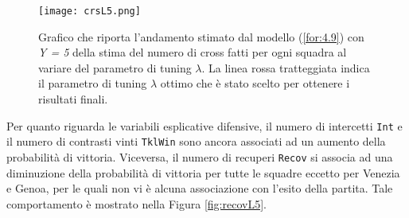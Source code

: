 \begin{figure}[htbp]
	\begin{center}
		\texttt{[image: crsL5.png]}
		\caption{Grafico che riporta l'andamento stimato dal modello (\ref{for:4.9}) con \emph{Y = 5} della stima del numero di cross fatti per ogni squadra al variare del parametro di tuning $\lambda$. La linea rossa tratteggiata indica il parametro di tuning $\lambda$ ottimo che è stato scelto per ottenere i risultati finali.} \label{fig:crsL5}
	\end{center}
\end{figure}
Per quanto riguarda le variabili esplicative difensive, il numero di intercetti \texttt{Int} e il numero di contrasti vinti \texttt{TklWin} sono ancora associati ad un aumento della probabilità di vittoria. Viceversa, il numero di recuperi \texttt{Recov} si associa ad una diminuzione della probabilità di vittoria per tutte le squadre eccetto per Venezia e Genoa, per le quali non vi è alcuna associazione con l'esito della partita. Tale comportamento è mostrato nella Figura \ref{fig:recovL5}.

